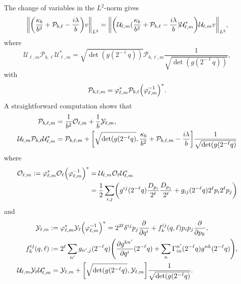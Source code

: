 \documentclass[10pt]{amsart}
\theoremstyle{definition}\newtheorem{defi}[theo]{Definition}\newtheorem{rema}[theo]{Remark}\newtheorem{exam}[theo]{Example}\newtheorem{exem}[theo]{Example}\newtheorem{nota}[theo]{Notation}
\newcommand{\clY}{\mathcal{Y}}
\newcommand{\clO}{\mathcal{O}}
\newcommand{\clP}{\mathcal{P}}
\newcommand{\clU}{\mathcal{U}}
\newcommand*{\Mk}{\mkern -2mu}
\newcommand*{\MK}{\mkern 2mu}
\let\originalleft\left
\let\originalright\right
\renewcommand{\left}{\mathopen{}\mathclose\bgroup\originalleft}
\renewcommand{\right}{\aftergroup\egroup\originalright}
\begin{document}
The change of variables in the $L^{2}$-norm gives
\begin{equation}\label{eq:ChangeOfVariableInL2NormAfterNormalCoordinate}
\left\| \left(\frac{\kappa_{b}}{b^{2}}+\clP_{b,\ell}-\frac{i\lambda}{b}\right)v \right\|_{L^2} = \left\|\left(\clU_{\ell,m} (\frac{\kappa_{b}}{b^{2}}+\clP_{b,\ell}-\frac{i\lambda}{b}) \clU_{\ell,m}^*\right) \clU_{\ell,m}v\right\|_{L^2},
\end{equation}
where
\[
\clU_{\ell,m}\clP_{b,\ell} \clU_{\ell,m}^* = \sqrt{\det (g(2^{-\ell}q))} \clP_{b,\ell,m} \frac{1}{\sqrt{\det (g(2^{-\ell}q))}},
\]
with
\[
\clP_{b,\ell,m} = \varphi_{\ell,m}^{*} \clP_{b,\ell} \left(\varphi^{-1}_{\ell,m}\right)^{*}.
\]
A straightforward computation shows that
\begin{align}
\clP_{b,\ell,m} & = \frac{1}{b^{2}}\clO_{\ell,m}+\frac{1}{b}\clY_{\ell,m} ,\label{eq:defPbellm} \\
\clU_{\ell,m} \clP_{b,\ell} \clU_{\ell,m}^* & = \clP_{b,\ell,m} + \left[\sqrt{\det (g(2^{-\ell}q)}, \frac{\kappa_b}{b^2} + \clP_{b,\ell,m} - \frac{i\lambda}{b} \right] \frac{1}{\sqrt{\det (g(2^{-\ell}q)}} \label{eq:ConjugationByUnitary}
\end{align}
where
\begin{equation}\label{eq:defOellm}
\begin{aligned}[t]
\clO_{\ell,m} := \varphi_{\ell,m}^*\clO_{\ell} \left(\varphi_{\ell,m}^{-1}\right)^{*} &= \clU_{\ell,m} \clO_{\ell} \clU_{\ell,m}^*\\ &= \frac{1}{2}
\sum_{i,j}\left(g^{ij}(2^{-\ell}q)\frac{D_{p_{i}}}{2^{\ell}}\frac{D_{p_{j}}}{2^{\ell}} + g_{ij}(2^{-\ell}q)2^{\ell}p_{i}2^{\ell}p_{j}
\right)
\end{aligned}
\end{equation}
and
\begin{align}
\clY_{\ell,m} \,\MK &\!\Mk:= \varphi_{\ell,m}^*\clY_{\ell}\left(\varphi_{\ell,m}^{-1}\right)^*= 2^{2\ell}\delta^{ij}p_{j}\frac{\partial}{\partial q^{i}} + f_{k}^{ij}(q,\ell)p_{i}p_{j}\frac{\partial}{\partial p_{k}} ,\label{eq:defYellm} \\
f_{k}^{ij}(q,\ell) \,\MK &\!\Mk:= 2^{\ell} \sum_{n'}g_{n',j}(2^{-\ell}q)
\left(
\frac{\partial g^{k n'}}{\partial q^{i}}(2^{-\ell }q) + \sum_{n}\Gamma^{n'}_{in}(2^{-\ell} q)g^{n k}(2^{-\ell}q)
\right), \label{formOff}
\\
\clU_{\ell,m}\clY_{\ell} \clU_{\ell,m}^* & = \clY_{\ell,m} + \left[\sqrt{\det (g(2^{-\ell}q)}, \clY_{\ell,m} \right] \frac{1}{\sqrt{\det (g(2^{-\ell }q)}} \label{eq:linkBetweenYlmAndYl}
.
\end{align}
\end{document}
